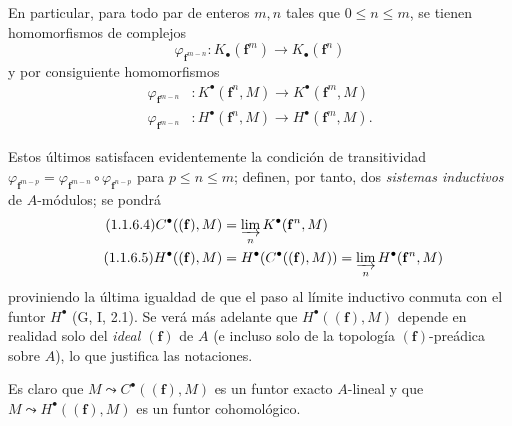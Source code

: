 \begin{env}[1.1.6]
\label{III.1.1.6-fr}
En particular, para todo par de enteros $m,n$ tales que $0\leq n\leq m$, se tienen homomorfismos de complejos
\begin{equation}
\label{III.1.1.6.1-fr}
\tag{1.1.6.1}
\varphi_{\mathbf f^{m-n}}:K_\bullet(\mathbf f^m)\longrightarrow
K_\bullet(\mathbf f^n)
\end{equation}
y por consiguiente homomorfismos
\begin{align}
\label{III.1.1.6.2-fr}
\tag{1.1.6.2}
\varphi_{\mathbf f^{m-n}} &:K^\bullet(\mathbf f^n,M)\longrightarrow
K^\bullet(\mathbf f^m,M)\\
\label{III.1.1.6.3-fr}
\tag{1.1.6.3}
\varphi_{\mathbf f^{m-n}} &:H^\bullet(\mathbf f^n,M)\longrightarrow
H^\bullet(\mathbf f^m,M).
\end{align}

Estos últimos satisfacen evidentemente la condición de transitividad
$\varphi_{\mathbf f^{m-p}}=
\varphi_{\mathbf f^{m-n}}\circ\varphi_{\mathbf f^{n-p}}$ para $p\leq n\leq m$; definen, por tanto, dos \emph{sistemas inductivos} de $A$-módulos; se pondrá
\begin{align}
\label{III.1.1.6.4-fr}
\tag{1.1.6.4}
C^\bullet((\mathbf f),M)&=\varinjlim_n K^\bullet(\mathbf f^n,M)\\
\label{III.1.1.6.5-fr}
\tag{1.1.6.5}
H^\bullet((\mathbf f),M)&=H^\bullet(C^\bullet((\mathbf f),M))
=\varinjlim_n H^\bullet(\mathbf f^n,M)
\end{align}
proviniendo la última igualdad de que el paso al límite inductivo conmuta con el funtor $H^\bullet$ (G, I, 2.1).
Se verá más adelante  que $H^\bullet((\mathbf f),M)$ depende en realidad solo del \emph{ideal $(\mathbf f)$} de $A$ (e incluso solo de la topología $(\mathbf f)$-preádica sobre $A$), lo que justifica las notaciones.

Es claro que $M\leadsto C^\bullet((\mathbf f),M)$ es un funtor exacto $A$-lineal y que $M\leadsto H^\bullet((\mathbf f),M)$ es un funtor cohomológico.
\end{env}

